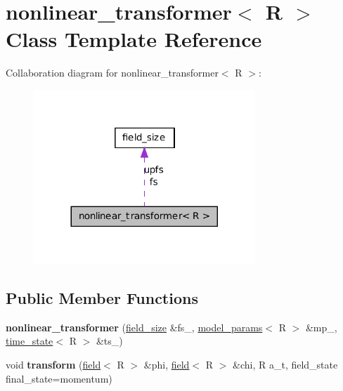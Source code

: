 \hypertarget{classnonlinear__transformer}{
\section{nonlinear\_\-transformer$<$ R $>$ Class Template Reference}
\label{classnonlinear__transformer}
}


Collaboration diagram for nonlinear\_\-transformer$<$ R $>$:
\nopagebreak
\begin{figure}[H]
\begin{center}
\leavevmode
\includegraphics[width=236pt]{classnonlinear__transformer__coll__graph}
\end{center}
\end{figure}
\subsection*{Public Member Functions}
\begin{DoxyCompactItemize}
\item 
\hypertarget{classnonlinear__transformer_aa967c562e62167837aecc554fc61ba09}{
{\bfseries nonlinear\_\-transformer} (\hyperlink{structfield__size}{field\_\-size} \&fs\_\-, \hyperlink{structmodel__params}{model\_\-params}$<$ R $>$ \&mp\_\-, \hyperlink{structtime__state}{time\_\-state}$<$ R $>$ \&ts\_\-)}
\label{classnonlinear__transformer_aa967c562e62167837aecc554fc61ba09}

\item 
\hypertarget{classnonlinear__transformer_ad5cb916a9ea10c1b17bac83a0acee3f0}{
void {\bfseries transform} (\hyperlink{classfield}{field}$<$ R $>$ \&phi, \hyperlink{classfield}{field}$<$ R $>$ \&chi, R a\_\-t, field\_\-state final\_\-state=momentum)}
\label{classnonlinear__transformer_ad5cb916a9ea10c1b17bac83a0acee3f0}

\end{DoxyCompactItemize}
